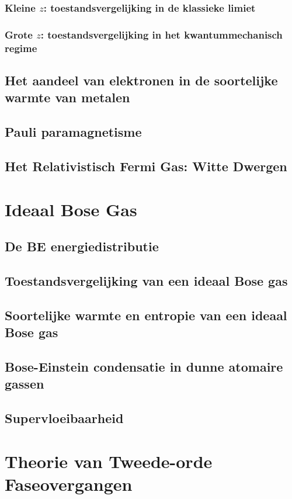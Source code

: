 \documentclass[a4paper,twoside]{article}
\theoremstyle{definition}
\theoremstyle{plain}
\begin{document}
\subsubsection{Kleine $z$: toestandsvergelijking in de klassieke limiet}
\subsubsection{Grote $z$: toestandsvergelijking in het kwantummechanisch regime}
\subsection{Het aandeel van elektronen in de soortelijke warmte van metalen}
\subsection{Pauli paramagnetisme}
\subsection{Het Relativistisch Fermi Gas: Witte Dwergen}

\section{Ideaal Bose Gas}
\subsection{De BE energiedistributie}
\subsection{Toestandsvergelijking van een ideaal Bose gas}
\subsection{Soortelijke warmte en entropie van een ideaal Bose gas}
\subsection{Bose-Einstein condensatie in dunne atomaire gassen}
\subsection{Supervloeibaarheid}

\section{Theorie van Tweede-orde Faseovergangen}
\end{document}
